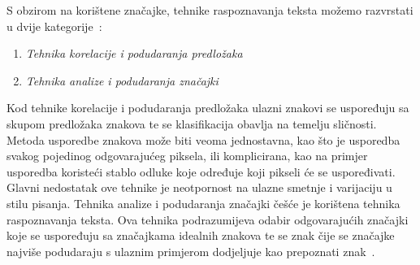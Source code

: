 S obzirom na korištene značajke, tehnike raspoznavanja teksta možemo razvrstati u dvije
kategorije\ \citep{govindan1989}:
\begin{enumerate}
    \item \emph{Tehnika korelacije i podudaranja predložaka}
    \item \emph{Tehnika analize i podudaranja značajki}
\end{enumerate}
Kod tehnike korelacije i podudaranja predložaka ulazni znakovi se uspoređuju sa skupom predložaka znakova te se
klasifikacija obavlja na temelju sličnosti. Metoda usporedbe znakova može biti veoma jednostavna, kao što je usporedba
svakog pojedinog odgovarajućeg piksela, ili komplicirana, kao na primjer usporedba koristeći stablo odluke koje određuje
koji pikseli će se uspoređivati. Glavni nedostatak ove tehnike je neotpornost na ulazne smetnje i varijaciju u stilu
pisanja. Tehnika analize i podudaranja značajki češće je korištena tehnika raspoznavanja teksta. Ova tehnika
podrazumijeva odabir odgovarajućih značajki koje se uspoređuju sa značajkama idealnih znakova te se znak čije se
značajke najviše podudaraju s ulaznim primjerom dodjeljuje kao prepoznati znak\ \citep{govindan1989}.


